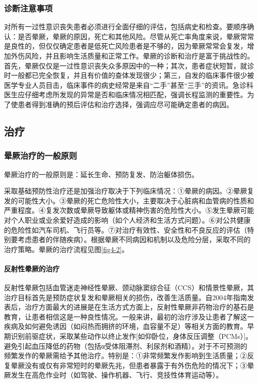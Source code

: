 \subsubsection{诊断注意事项}

对所有一过性意识丧失患者必须进行全面仔细的评估，包括病史和检查。要顺序确认：是否晕厥，晕厥的原因，死亡和其他风险。尽管从死亡率角度来说，晕厥常常是良性的，但仅仅确定患者是低死亡风险患者是不够的，因为晕厥常常会复发，增加外伤风险，并且影响生活质量和正常工作。晕厥的诊断和治疗是富于挑战性的。首先，晕厥仅仅是一过性意识丧失众多原因中的一种；其次，患者症状短暂，就诊时一般都已完全恢复，并且有价值的查体发现很少；第三，自发的临床事件很少被医学专业人员目击，临床事件的病史经常是来自“二手”甚至“三手”的资讯。急诊科医生应仔细考虑所发现的异常是否和临床情况相匹配，强调长程监测的重要性。为了使患者得到准确的预后评估和治疗选择，强调应尽可能确定患者的病因。

\subsection{治疗}

\subsubsection{晕厥治疗的一般原则}

晕厥治疗的一般原则是：延长生命、预防复发、防治躯体损伤。

采取基础预防性治疗还是加强治疗取决于下列临床情况：①晕厥的病因。②晕厥复发的可能性大小。③晕厥的死亡危险性大小，主要取决于心脏病和血管病的性质和严重程度。④复发次数或晕厥导致躯体或精神伤害的危险性大小。⑤发生晕厥可能对个人职业或业余爱好造成的影响（如个人经济和生活方式问题）。⑥对公共健康的危险性如汽车司机、飞行员等。⑦对治疗有效性、安全性和不良反应的评估（特别要考虑患者的伴随疾病）。根据晕厥不同病因和机制以及危险分层，采取不同的治疗策略。晕厥的治疗流程见图\ref{fig4-2}。

\paragraph{反射性晕厥的治疗}

反射性晕厥包括血管迷走神经性晕厥、颈动脉窦综合征（CCS）和情景性晕厥，其治疗目标首先是预防症状复发和晕厥相关的损伤，改善生活质量。自2004年指南发表后，治疗方面最大的进展是在生活方式方面上，反射性晕厥非药物治疗的基石是教育，让患者相信这是一种良性情况。一般来讲，最初的治疗涉及让患者了解这一疾病及如何避免诱因（如闷热而拥挤的环境，血容量不足）等相关方面的教育。早期识别前驱症状，采取某些动作以终止发作{[}如仰卧位，身体反压调整（PCMs）{]}。避免引起血压降低的药物（包括α受体阻滞剂、利尿剂和酒精）。对于不可预测的频繁发作的晕厥需给予其他治疗。特别是：①非常频繁发作影响到生活质量；②反复晕厥没有或仅有非常短时的晕厥先兆，但患者暴露于有外伤危险的情况下；③晕厥发生在高危作业时（如驾驶、操作机器、飞行、竞技性体育运动等）。

